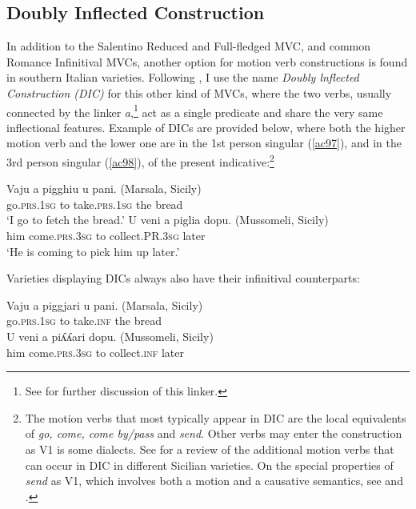 \documentclass[output=paper]{langscibook}
\begin{document}
\subsection{Doubly Inflected Construction}

In addition to the Salentino Reduced and Full-fledged MVC, and common Romance Infinitival MVCs, another option for motion verb constructions is found in southern Italian varieties. Following \citet{cruschina2013a}, I use the name \textit{Doubly lnflected Construction (DIC)} for this other kind of MVCs, where the two verbs, usually connected by the linker \textit{a},\footnote{See \citet{cruschina2021a} for further discussion of this linker.}  act as a single predicate and share the very same inflectional features. Example of DICs are provided below, where both the higher motion verb and the lower one are in the 1st person singular (\ref{ac97}), and in the 3rd person singular (\ref{ac98}), of the present indicative:\footnote{The motion verbs that most typically appear in DIC are the local equivalents of \textit{go, come, come by\slash pass} and \textit{send}. Other verbs may enter the construction as V1 is some dialects. See \citet{caro2018a, caro2019a} for a review of the additional motion verbs that can occur in DIC in different Sicilian varieties. On the special properties of \textit{send} as V1, which involves both a motion and a causative semantics, see \citet{todaro2018a} and \citet{prete2020a}.}

\ea \label{ac97}
\gll Vaju    a   pigghiu    u   pani.    (Marsala, Sicily)\\
   go.\textsc{prs}.\textsc{1sg} to   take.\textsc{prs}.\textsc{1sg}  the  bread \\
 \glt  ‘I go to fetch the bread.’ \hfill \citep[373]{cardinaletti2001a}
\ex \label{ac98}
\gll  U   veni      a  piglia   dopu.      (Mussomeli, Sicily)\\
   him  come.\textsc{prs}.\textsc{3sg}  to  collect.PR.\textsc{3sg} later\\
\glt   ‘He is coming to pick him up later.’ \hfill \citep[266]{cruschina2013a}
\z

Varieties displaying DICs always also have their infinitival counterparts:

\ea \label{ac99}\gll Vaju    a  piggjari u     pani.    (Marsala, Sicily)\\
go.\textsc{prs}.\textsc{1sg} to  take.\textsc{inf} the    bread \\
\ex \label{ac100}\gll U   veni      a   piʎʎari   dopu.   (Mussomeli, Sicily)\\
him  come.\textsc{prs}.\textsc{3sg} to   collect.\textsc{inf} later\\
\z
\end{document}
